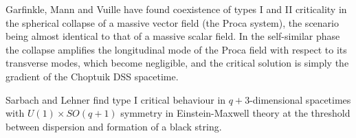 \documentclass{article}
\begin{document}
Garfinkle, Mann and Vuille \cite{GarfinkleMannVuille} have found
coexistence of types I and II criticality in the spherical collapse
of a massive vector field (the Proca system), the scenario being
almost identical to that of a massive scalar field. In the self-similar
phase the collapse amplifies the longitudinal mode of the Proca field
with respect to its transverse modes, which become negligible, and
the critical solution is simply the gradient of the Choptuik
DSS spacetime.

Sarbach and Lehner \cite{SarbachLehner} find type I critical behaviour
in $q+3$-dimensional spacetimes with $U(1)\times SO(q+1)$ symmetry in
Einstein-Maxwell theory at the threshold between dispersion and
formation of a black string.



\end{document}
